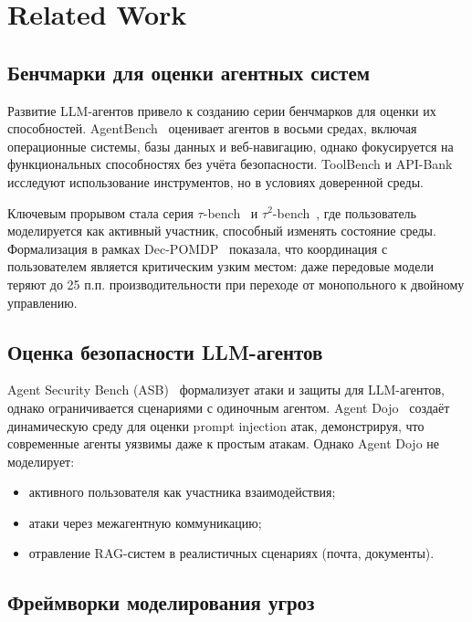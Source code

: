 \documentclass{article}
\begin{document}
\section{Related Work}

\subsection{Бенчмарки для оценки агентных систем}

Развитие LLM-агентов привело к созданию серии бенчмарков для оценки их способностей. AgentBench~\cite{agent_bench} оценивает агентов в восьми средах, включая операционные системы, базы данных и веб-навигацию, однако фокусируется на функциональных способностях без учёта безопасности. ToolBench и API-Bank исследуют использование инструментов, но в условиях доверенной среды.

Ключевым прорывом стала серия $\tau$-bench~\cite{tau_bench_2024} и $\tau^2$-bench~\cite{tau2_bench_2025}, где пользователь моделируется как активный участник, способный изменять состояние среды. Формализация в рамках Dec-POMDP~\cite{amato_2013} показала, что координация с пользователем является критическим узким местом: даже передовые модели теряют до 25 п.п. производительности при переходе от монопольного к двойному управлению.

\subsection{Оценка безопасности LLM-агентов}

Agent Security Bench (ASB)~\cite{asb} формализует атаки и защиты для LLM-агентов, однако ограничивается сценариями с одиночным агентом. Agent Dojo~\cite{agent_dojo} создаёт динамическую среду для оценки prompt injection атак, демонстрируя, что современные агенты уязвимы даже к простым атакам. Однако Agent Dojo не моделирует:
\begin{itemize}
    \item активного пользователя как участника взаимодействия;
    \item атаки через межагентную коммуникацию;
    \item отравление RAG-систем в реалистичных сценариях (почта, документы).
\end{itemize}

\subsection{Фреймворки моделирования угроз}
\end{document}

